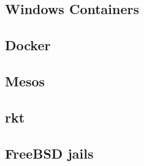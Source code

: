 \subsection{Windows Containers}
\label{sec:WindowsContainers}

\subsection{Docker}
\label{sec:Docker}

\subsection{Mesos}
\label{sec:Mesos}

\subsection{rkt}
\label{sec:rkt}

\subsection{FreeBSD jails}
\label{sec:jails}


